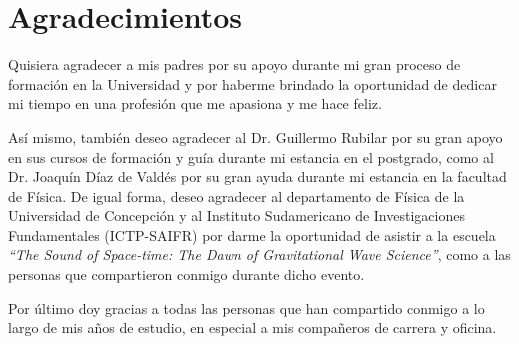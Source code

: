 \chapter*{Agradecimientos}

Quisiera agradecer a mis padres por su apoyo durante mi gran proceso de formación en la Universidad y por haberme brindado la oportunidad de dedicar mi tiempo en una profesión que me apasiona y me hace feliz. 

Así mismo, también deseo agradecer al Dr. Guillermo Rubilar por su gran apoyo en sus cursos de formación y guía durante mi estancia en el postgrado, como al Dr. Joaquín Díaz de Valdés por su gran ayuda durante mi estancia en la facultad de Física. De igual forma, deseo agradecer al departamento de Física de la Universidad de Concepción y al Instituto Sudamericano de Investigaciones Fundamentales (ICTP-SAIFR) por darme la oportunidad de asistir a la escuela \textit{``The Sound of Space-time: The Dawn of Gravitational Wave Science''}, como a las personas que compartieron conmigo durante dicho evento.

Por último doy gracias a todas las personas que han compartido conmigo a lo largo de mis años de estudio, en especial a mis compañeros de carrera y oficina.